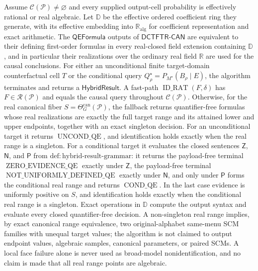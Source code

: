 Assume \(\mathcal C(\mathcal P)\ne\varnothing\) and every supplied output-cell probability is effectively rational or real algebraic.  Let \(\mathbb D\) be the effective ordered coefficient ring they generate, with its effective embedding into \(\mathbb R_{\mathrm{alg}}\) for coefficient representation and exact arithmetic.  The \(\mathsf{QEFormula}\) outputs of \(\mathsf{DCTFTR\text{-}CAN}\) are equivalent to their defining first-order formulas in every real-closed field extension containing \(\mathbb D\), and in particular their realizations over the ordinary real field \(\mathbb R\) are used for the causal conclusions.  For either an unconditional finite target-domain counterfactual cell \(T\) or the conditional query \(Q_\rho^\star=P_{M^\star}(B_\rho\mid E)\), the algorithm terminates and returns a \(\mathsf{HybridResult}\).  A fast-path \(\operatorname{ID\_RAT}(F,\delta)\) has \(F\in\mathscr R(\mathcal P)\) and equals the causal query throughout \(\mathcal C(\mathcal P)\).  Otherwise, for the real canonical fiber \(S=\Theta_G^{\mathrm{can}}(\mathcal P)\), the fallback returns quantifier-free formulas whose real realizations are exactly the full target range and its attained lower and upper endpoints, together with an exact singleton decision.  For an unconditional target it returns \(\operatorname{UNCOND\_QE}\), and identification holds exactly when the real range is a singleton.  For a conditional target it evaluates the closed sentences \(\mathsf Z\), \(\mathsf N\), and \(\mathsf P\) from \(\mathrm{def:hybrid\text{-}result\text{-}grammar}\): it returns the payload-free terminal \(\operatorname{ZERO\_EVIDENCE\_QE}\) exactly under \(\mathsf Z\), the payload-free terminal \(\operatorname{NOT\_UNIFORMLY\_DEFINED\_QE}\) exactly under \(\mathsf N\), and only under \(\mathsf P\) forms the conditional real range and returns \(\operatorname{COND\_QE}\).  In the last case evidence is uniformly positive on \(S\), and identification holds exactly when the conditional real range is a singleton.  Exact operations in \(\mathbb D\) compute the output syntax and evaluate every closed quantifier-free decision.  A non-singleton real range implies, by exact canonical range equivalence, two original-alphabet same-menu SCM families with unequal target values; the algorithm is not claimed to output endpoint values, algebraic samples, canonical parameters, or paired SCMs.  A local face failure alone is never used as broad-model nonidentification, and no claim is made that all real range points are algebraic.